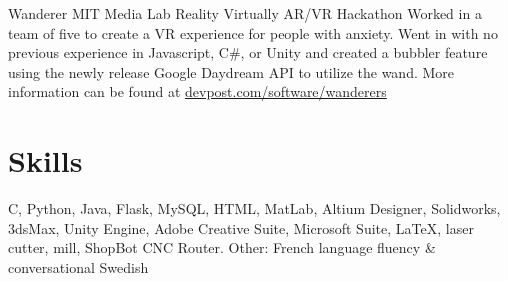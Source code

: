 \documentclass[11 pt]{moderncv}
\begin{document}
{Wanderer}
{MIT Media Lab Reality Virtually AR/VR Hackathon}
{}
{}
{Worked in a team of five to create a VR experience for people with anxiety. Went in with no previous experience in Javascript, C\#, or Unity and created a bubbler feature using the newly release Google Daydream API to utilize the wand. More information can be found at \href{https://devpost.com/software/wanderers}{devpost.com/software/wanderers}}

\section{Skills}

\cvline{}
{
C,
Python,
Java,
Flask,
MySQL,
HTML,
MatLab,
Altium Designer,
Solidworks,
3dsMax,
Unity Engine,
Adobe Creative Suite,
Microsoft Suite,
\LaTeX{},
laser cutter,
mill,
ShopBot CNC Router.
}
\cvline{}
{Other: French language fluency \& conversational Swedish}
\end{document}
